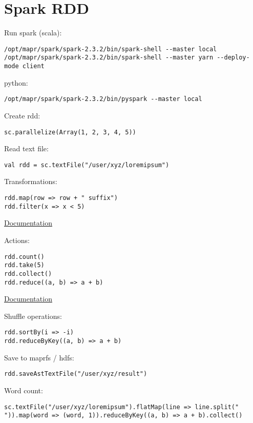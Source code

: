 \documentclass{article}
\begin{document}
\section*{Spark RDD}

Run spark (scala):
\begin{lstlisting}[]
/opt/mapr/spark/spark-2.3.2/bin/spark-shell --master local
/opt/mapr/spark/spark-2.3.2/bin/spark-shell --master yarn --deploy-mode client
\end{lstlisting}

python:
\begin{lstlisting}[]
/opt/mapr/spark/spark-2.3.2/bin/pyspark --master local
\end{lstlisting}

Create rdd:
\begin{lstlisting}[]
sc.parallelize(Array(1, 2, 3, 4, 5))
\end{lstlisting}

Read text file:
\begin{lstlisting}[]
val rdd = sc.textFile("/user/xyz/loremipsum")
\end{lstlisting}

Transformations:
\begin{lstlisting}[]
rdd.map(row => row + " suffix")
rdd.filter(x => x < 5)
\end{lstlisting}
\href{https://spark.apache.org/docs/latest/rdd-programming-guide.html#transformations}{Documentation}

Actions:
\begin{lstlisting}[]
rdd.count()
rdd.take(5)
rdd.collect()
rdd.reduce((a, b) => a + b)
\end{lstlisting}
\href{https://spark.apache.org/docs/latest/rdd-programming-guide.html#actions}{Documentation}

Shuffle operations:
\begin{lstlisting}[]
rdd.sortBy(i => -i)
rdd.reduceByKey((a, b) => a + b)
\end{lstlisting}

Save to maprfs / hdfs:
\begin{lstlisting}[]
rdd.saveAstTextFile("/user/xyz/result")
\end{lstlisting}

Word count:
\begin{lstlisting}[]
sc.textFile("/user/xyz/loremipsum").flatMap(line => line.split(" ")).map(word => (word, 1)).reduceByKey((a, b) => a + b).collect()
\end{lstlisting}
\end{document}
